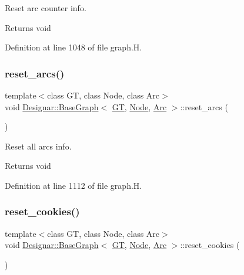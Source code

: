 Reset arc counter info. 

\begin{DoxyReturn}{Returns}
void 
\end{DoxyReturn}


Definition at line 1048 of file graph.\+H.

\mbox{\label{class_designar_1_1_base_graph_a6dc66191c2d752bf7f67a4522a7830e3}} 
\subsubsection{\texorpdfstring{reset\+\_\+arcs()}{reset\_arcs()}}
{\footnotesize\ttfamily template$<$class GT, class Node, class Arc$>$ \\
void \hyperlink{class_designar_1_1_base_graph}{Designar\+::\+Base\+Graph}$<$ \hyperlink{demo-buildgraph_8_c_a3001c40d2c31ca87ed96cd7d1334a55e}{GT}, \hyperlink{namespace_designar_a5af326c65aa2bd26b26c410f2030d09e}{Node}, \hyperlink{namespace_designar_a3f55fb5513d62ff47cbc8f72b8e95d6f}{Arc} $>$\+::reset\+\_\+arcs (\begin{DoxyParamCaption}{ }\end{DoxyParamCaption})\hspace{0.3cm}{\ttfamily [inline]}}



Reset all arcs info. 

\begin{DoxyReturn}{Returns}
void 
\end{DoxyReturn}


Definition at line 1112 of file graph.\+H.

\mbox{\label{class_designar_1_1_base_graph_a96a630fd589c34e7e6242f4349606e1c}} 
\subsubsection{\texorpdfstring{reset\+\_\+cookies()}{reset\_cookies()}}
{\footnotesize\ttfamily template$<$class GT, class Node, class Arc$>$ \\
void \hyperlink{class_designar_1_1_base_graph}{Designar\+::\+Base\+Graph}$<$ \hyperlink{demo-buildgraph_8_c_a3001c40d2c31ca87ed96cd7d1334a55e}{GT}, \hyperlink{namespace_designar_a5af326c65aa2bd26b26c410f2030d09e}{Node}, \hyperlink{namespace_designar_a3f55fb5513d62ff47cbc8f72b8e95d6f}{Arc} $>$\+::reset\+\_\+cookies (\begin{DoxyParamCaption}{ }\end{DoxyParamCaption})\hspace{0.3cm}{\ttfamily [inline]}}



